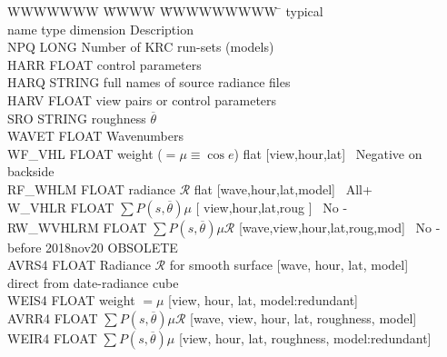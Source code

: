 \documentclass{article}
\begin{document}
\begin{table} \caption[Roughness integration output]{File saved after integration ovr facets for roughness. Shown here for global runs; single targets are missing the Hour and Lat dimensions.  $\sum$ is over azimuths and slopes. }  
\hrulefill
\begin{tabbing} 
WWWWWWW \= WWWW \=WWWWWWWWW \=   \kill 
     \>     \> typical \>  \\
name \> type \> dimension \> \hspace{2.cm} Description \\
NPQ   \>  LONG          \>  Number of KRC run-sets (models) \\
HARR \>   FLOAT  \> [12] \>   control parameters  \\
HARQ \>   STRING \> [5] \>   full names of source radiance files \\
HARV \>   FLOAT  \> [12] \>   view pairs or control parameters \\ 
SRO  \>   STRING \> [2] \> roughness $\overline{\theta } $ \\ 
WAVET  \> FLOAT  \> [9] \> Wavenumbers \\
WF_VHL    \> FLOAT \> [18, 48, 19]   \> weight ($=\mu \equiv \cos e$) flat [view,hour,lat] \ Negative on backside \\
RF_WHLM   \> FLOAT \> [9, 48, 19, 2] \> radiance $\mathcal{R}$ flat [wave,hour,lat,model] \ All+ \\
W_VHLR    \> FLOAT \> [ \hspace{5.0mm} 18, 48, 19, 3  \ ] \> $\sum P(s,\overline{\theta}) \mu$ \hspace{1.9mm} [ \hspace{6.4mm} view,hour,lat,roug \hspace{5.0mm} ] \ No -\\
RW_WVHLRM \> FLOAT \> [9, 18, 48, 19, 3, 2] \> $\sum P(s,\overline{\theta}) \mu \mathcal{R}$ [wave,view,hour,lat,roug,mod]  \ No - \\
 \>  \>  before 2018nov20   \>  OBSOLETE \\
AVRS4  \> FLOAT \>  [9,48,19,5] \> Radiance  $\mathcal{R}$ for smooth surface [wave, hour, lat, model] \\
\> \> \> direct from date-radiance cube \\
WEIS4 \>  FLOAT \>  [18,48,19,5] \> weight $=\mu $ [view, hour, lat, model:redundant]  \\
AVRR4 \>  FLOAT  \> [9,18,48,19,2,5] \> $\sum P(s,\overline{\theta}) \mu \mathcal{R}$ [wave, view, hour, lat, roughness, model] \\
WEIR4 \>  FLOAT  \> [18,48,19,2,5] \> $\sum P(s,\overline{\theta}) \mu$ [view, hour, lat, roughness, model:redundant]  \\
\end{tabbing}
\vspace{-5.mm}
\hrulefill \end{table} 
\end{document}
